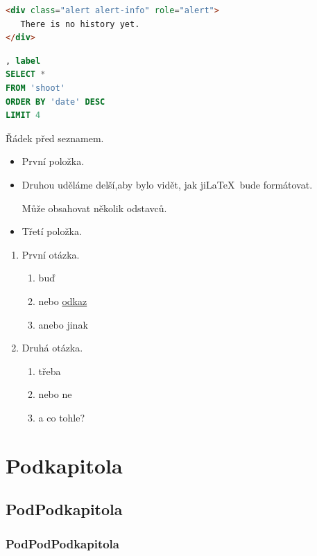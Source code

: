 \documentclass[FM,DP]{tulthesis}
\begin{document}
\begin{lstlisting}[language=html, caption=HTML example]
<div class="alert alert-info" role="alert">
   There is no history yet.
</div>
\end{lstlisting}


\begin{lstlisting}[language=sql, caption=SQL example], label
SELECT * 
FROM 'shoot' 
ORDER BY 'date' DESC 
LIMIT 4
\end{lstlisting}


Řádek před seznamem.
\begin{itemize}
\item První položka.
\item Druhou uděláme delší,aby bylo vidět, jak ji\LaTeX\ bude formátovat. 

Může obsahovat několik odstavců.

\item Třetí položka.
\end{itemize}




\begin{enumerate}

\item První otázka.
\begin{enumerate}
\item buď
\item nebo \href{www.jakubjirous.cz}{odkaz}
\item anebo jinak
\end{enumerate}

\item Druhá otázka.
\begin{enumerate}
\item třeba
\item nebo ne
\item a co tohle?
\end{enumerate}

\end{enumerate}


\section{Podkapitola}

\subsection{PodPodkapitola}

\subsubsection{PodPodPodkapitola}
\end{document}
